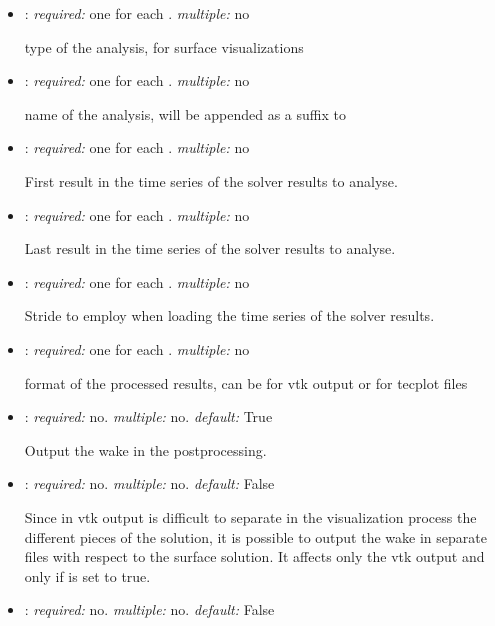 \begin{itemize}
\item {}: \textit{required:} one for each . \textit{multiple:} no

type of the analysis,  for surface visualizations

\item {}: \textit{required:} one for each . \textit{multiple:} no

name of the analysis, will be appended as a suffix to 

\item {}: \textit{required:} one for each . \textit{multiple:} no

First result in the time series of the solver results to analyse.

\item {}: \textit{required:} one for each . \textit{multiple:} no

Last result in the time series of the solver results to analyse.

\item {}: \textit{required:} one for each . \textit{multiple:} no

Stride to employ when loading the time series of the solver results. 

\item {}: \textit{required:} one for each . \textit{multiple:} no

format of the processed results, can be  for vtk output or  
for tecplot  files

\item {}: \textit{required:} no. \textit{multiple:} no. \textit{default:} True

Output the wake in the postprocessing.

\item {}: \textit{required:} no. \textit{multiple:} no. 
\textit{default:} False

Since in vtk output is difficult to separate in the visualization process the 
different pieces of the solution, it is possible to output the wake in separate 
files with respect to the surface solution. It affects only the vtk output and 
only if  is set to true.

\item {}: \textit{required:} no. \textit{multiple:} no. \textit{default:} False


\end{itemize}
